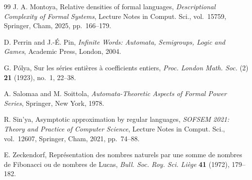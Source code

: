 \documentclass[11pt,a4paper]{amsart}
\theoremstyle{plain}
\theoremstyle{definition}
\theoremstyle{remark}
\begin{document}
\begin{thebibliography}{99}
J. A. Montoya,
Relative densities of formal languages,
\textit{Descriptional Complexity of Formal Systems},
Lecture Notes in Comput. Sci., vol.~15759, Springer, Cham, 2025,
pp.~166--179.

D. Perrin and J.-\'E. Pin,
\textit{Infinite Words: Automata, Semigroups, Logic and Games},
Academic Press, London, 2004.

G. P{\'o}lya,
Sur les s{\'e}ries enti{\`e}res {\`a} coefficients entiers,
\textit{Proc. London Math. Soc.} (2) \textbf{21} (1923), no.~1, 22--38.

A. Salomaa and M. Soittola,
\textit{Automata-Theoretic Aspects of Formal Power Series},
Springer, New York, 1978.

R. Sin'ya,
Asymptotic approximation by regular languages,
\textit{SOFSEM 2021: Theory and Practice of Computer Science},
Lecture Notes in Comput. Sci., vol.~12607, Springer, Cham, 2021,
pp.~74--88.

E. Zeckendorf,
Repr{\'e}sentation des nombres naturels par une somme de nombres de
Fibonacci ou de nombres de Lucas,
\textit{Bull. Soc. Roy. Sci. Li{\`e}ge} \textbf{41} (1972), 179--182.

\end{thebibliography}
\end{document}
